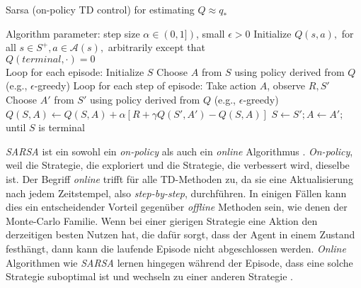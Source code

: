\begin{algorithm}
    \caption{Sarsa (on-policy TD control) for estimating $Q \approx q_*$}
    \begin{algorithmic}[1]
        \State Algorithm parameter: step size $\alpha \in (0,1])$, small $\epsilon > 0$
        \State Initialize $Q(s,a),$ for all $s \in S^+, a \in \mathcal{A}(s),$ arbitrarily except that \\ $Q(terminal, \mathord{\cdot}) = 0$
        \\
        \State Loop for each episode:
        \Indent
            \State Initialize $S$
            \State Choose $A$ from $S$ using policy derived from $Q$ (e.g., $\epsilon$-greedy)
            \State Loop for each step of episode:
            \Indent
                \State Take action $A$, observe $R, S'$
                \State Choose $A'$ from $S'$ using policy derived from $Q$ (e.g., $\epsilon$-greedy)
                \State $Q(S,A) \gets Q(S,A) + \alpha [R + \gamma Q(S',A') - Q(S,A)]$
                \State $S \gets S'; A \gets A';$
            \EndIndent
            \State until $S$ is terminal
        \EndIndent 
    \end{algorithmic}
\end{algorithm}
\par 
\textit{SARSA} ist ein sowohl ein \textit{on-policy} als auch ein \textit{online} Algorithmus \cite[S.~129f]{Sutton1998}. \textit{On-policy}, weil die Strategie, die exploriert und die Strategie, die verbessert wird, dieselbe ist. Der Begriff \textit{online} trifft für alle TD-Methoden zu, da sie eine Aktualisierung nach jedem Zeitstempel, also \textit{step-by-step}, durchführen. In einigen Fällen kann dies ein entscheidender Vorteil gegenüber \textit{offline} Methoden sein, wie denen der Monte-Carlo Familie. Wenn bei einer gierigen Strategie eine Aktion den derzeitigen besten Nutzen hat, die dafür sorgt, dass der Agent in einem Zustand festhängt, dann kann die laufende Episode nicht abgeschlossen werden. \textit{Online} Algorithmen wie \textit{SARSA} lernen hingegen während der Episode, dass eine solche Strategie suboptimal ist und wechseln zu einer anderen Strategie \cite[S.~130]{Sutton1998}.
\pagebreak
